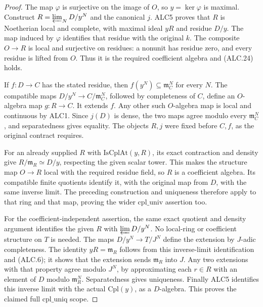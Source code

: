 \documentclass[11pt,a4paper]{article}
\numberwithin{equation}{section}
\theoremstyle{remark}\newtheorem{remark}[theorem]{Remark}
\begin{document}
\begin{proof}
The map \(\varphi\) is surjective on the image of \(O\),
so \(y=\ker\varphi\) is maximal.  Construct
\(R=\varprojlim_N D/y^N\) and the canonical \(j\).
ALC5 proves that \(R\) is Noetherian local and complete,
with maximal ideal \(yR\) and residue \(D/y\).
The map induced by \(\varphi\) identifies that residue
with the original \(k\).  The composite \(O\to R\)
is local and surjective on residues: a nonunit has residue
zero, and every residue is lifted from \(O\).  Thus it
is the required coefficient algebra and (ALC.24) holds.

If \(f:D\to C\) has the stated residue, then
\(f(y^N)\subseteq\mathfrak m_C^N\) for every \(N\).
The compatible maps
\(D/y^N\to C/\mathfrak m_C^N\), followed by completeness
of \(C\), define an \(O\)-algebra map \(g:R\to C\).
It extends \(f\).  Any other such \(O\)-algebra map is
local and continuous by ALC1.  Since \(j(D)\) is dense,
the two maps agree modulo every \(\mathfrak m_C^N\),
and separatedness gives equality.  The objects \(R,j\)
were fixed before \(C,f\), as the original contract requires.

For an already supplied \(R\) with
\(\mathrm{IsCplAt}(y,R)\), its exact contraction and
density give \(R/\mathfrak m_R\simeq D/y\), respecting
the given scalar tower.  This makes the structure map
\(O\to R\) local with the required residue field, so
\(R\) is a coefficient algebra.  Its compatible finite
quotients identify it, with the original map from \(D\),
with the same inverse limit.  The preceding construction
and uniqueness therefore apply to that ring and that map,
proving the wider \(\mathrm{cpl\_\allowbreak univ}\) assertion too.

For the coefficient-independent assertion, the same exact
quotient and density argument identifies the given \(R\)
with \(\varprojlim D/y^N\).  No local-ring or coefficient
structure on \(T\) is needed.  The maps
\(D/y^N\to T/J^N\) define the extension by \(J\)-adic
completeness.  The identity \(yR=\mathfrak m_R\) follows
from this inverse-limit identification and (ALC.6); it
shows that the extension sends \(\mathfrak m_R\) into
\(J\).  Any two extensions with that property agree
modulo \(J^N\), by approximating each \(r\in R\) with
an element of \(D\) modulo \(\mathfrak m_R^N\).
Separatedness gives uniqueness.  Finally ALC5 identifies
this inverse limit with the actual \(\mathrm{Cpl}(y)\),
as a \(D\)-algebra.  This proves the claimed full
\(\mathrm{cpl\_\allowbreak uniq}\) scope.
\end{proof}
\end{document}
